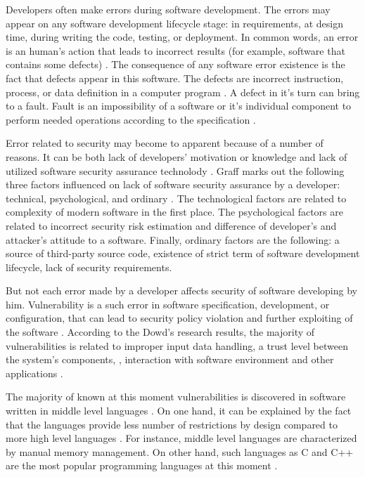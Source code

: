 %
Developers often make errors during software development. 
%
The errors may appear on any software development lifecycle stage: in requirements, at design time, during writing the code, testing, or deployment. 
%
In common words, an error is an human's action that leads to incorrect results (for example, software that contains some defects) . 
%
The consequence of any software error existence is the fact that defects appear in this software. 
%
The defects are incorrect instruction, process, or data definition in a computer program . 
%
A defect in it's turn can bring to a fault. 
%
Fault is an impossibility of a software or it's individual component to perform needed operations according to the specification . 

%
Error related to security may become to apparent because of a number of reasons. 
%
It can be both lack of developers' motivation or knowledge and lack of utilized software security assurance technolody . 
%
Graff marks out the following three factors influenced on lack of software security assurance by a developer: technical, psychological, and ordinary . 
%
The technological factors are related to complexity of modern software in the first place. 
%
The psychological factors are related to incorrect security risk estimation and difference of developer's and attacker's attitude to a software. 
%
Finally, ordinary factors are the following: a source of third-party source code, existence of strict term of software development lifecycle, lack of security requirements. 

%
But not each error made by a developer affects security of software developing by him. 
%
Vulnerability is a such error in software specification, development, or configuration, that can lead to security policy violation and further exploiting of the software    . 
%
According to the Dowd's research results, the majority of vulnerabilities is related to improper input data handling, a trust level between the system's components, , interaction with software environment and other applications . 

%
The majority of known at this moment vulnerabilities is discovered in software written in middle level languages   . 
%
On one hand, it can be explained by the fact that the languages provide less number of restrictions by design compared to more high level languages . 
%
For instance, middle level languages are characterized by manual memory management. 
%
On other hand, such languages as C  and C++  are the most popular programming languages at this moment . 

